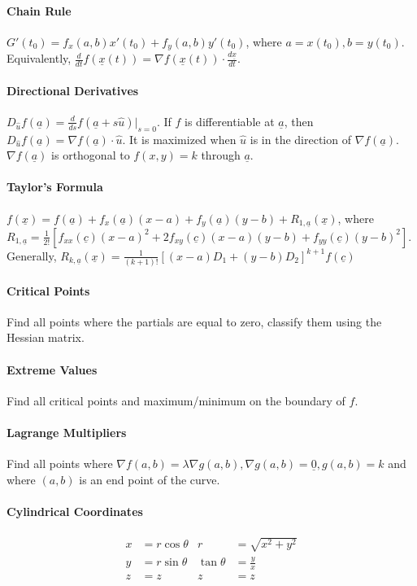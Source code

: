 \documentclass[10pt,letter]{article}
\theoremstyle{plain}
\theoremstyle{definition}
\begin{document}
\paragraph{Chain Rule} $G'(t_0)=f_x(a,b)x'(t_0)+f_y(a,b)y'(t_0)$, where $a=x(t_0),b=y(t_0)$. Equivalently, $\frac{d}{dt}f(\underline{x}(t))=\nabla f(\underline{x}(t))\cdot\frac{d\underline{x}}{dt}$. 
\paragraph{Directional Derivatives} $D_{\hat{u}}f(\underline{a})=\frac{d}{ds}f(\underline{a}+s\hat{u})|_{s=0}$. If $f$ is differentiable at $\underline{a}$, then $D_{\hat{u}}f(\underline{a})=\nabla f(\underline{a})\cdot\hat{u}$. It is maximized when $\hat{u}$ is in the direction of $\nabla f(\underline{a})$. $\nabla f(\underline{a})$ is orthogonal to $f(x,y)=k$ through $\underline{a}$. 
\paragraph{Taylor's Formula} $f(\underline{x})=f(\underline{a})+f_x(\underline{a})(x-a)+f_y(\underline{a})(y-b)+R_{1,\underline{a}}(\underline{x})$, where $R_{1,\underline{a}}=\frac{1}{2!}[f_{xx}(\underline{c})(x-a)^2+2f_{xy}(\underline{c})(x-a)(y-b)+f_{yy}(\underline{c})(y-b)^2]$. Generally, $R_{k,\underline{a}}(\underline{x})=\frac{1}{(k+1)!}[(x-a)D_1+(y-b)D_2]^{k+1}f(\underline{c})$
\paragraph{Critical Points} Find all points where the partials are equal to zero, classify them using the Hessian matrix. 
\paragraph{Extreme Values} Find all critical points and maximum/minimum on the boundary of $f$. 
\paragraph{Lagrange Multipliers} Find all points where $\nabla f(a,b)=\lambda\nabla g(a,b), \nabla g(a,b)=\underline{0}, g(a,b)=k$ and where $(a,b)$ is an end point of the curve. 
\paragraph{Cylindrical Coordinates} \begin{align*}x&=r\cos\theta&r&=\sqrt{x^2+y^2}\\y&=r\sin\theta&\tan\theta&=\frac{y}{x}\\z&=z&z&=z\end{align*}
\end{document}
